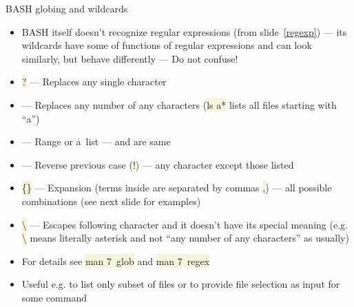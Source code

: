 \documentclass[compress, xelatex, 11pt, xcolor=svgnames, aspectratio=169, url={hyphens, lowtilde}]{beamer}
\renewcommand{\texttt}[1]{\colorbox{Beige}{{\ttfamily #1}}}
\begin{document}
\begin{frame}{BASH globing and wildcards}
	\label{globbing}
	\begin{itemize}
		\item BASH itself doesn't recognize regular expressions (from slide~\ref{regexp}) --- its wildcards have some of functions of regular expressions and can look similarly, but behave differently --- Do not confuse!
		\item \texttt{?} --- Replaces any single character
		\item \texttt{*} --- Replaces any number of any characters (\texttt{ls a*} lists all files starting with \enquote{a})
		\item \texttt{[]} --- Range or a~list --- \texttt{[abcdef]} and \texttt{[a-f]} are same
		\item \texttt{[!\ldots]} --- Reverse previous case (\texttt{!}) --- any character except those listed
		\item \texttt{\{\}} --- Expansion (terms inside are separated by commas \texttt{,}) --- all possible combinations (see next slide for examples)
		\item \texttt{\textbackslash} --- Escapes following character and it doesn't have its special meaning (e.g. \texttt{\textbackslash *} means literally asterisk \texttt{*} and not \enquote{any number of any characters} as usually)
		\item For details see \texttt{man 7~glob} and \texttt{man 7~regex}
		\item Useful e.g. to list only subset of files or to provide file selection as input for some command
	\end{itemize}
\end{frame}
\end{document}
